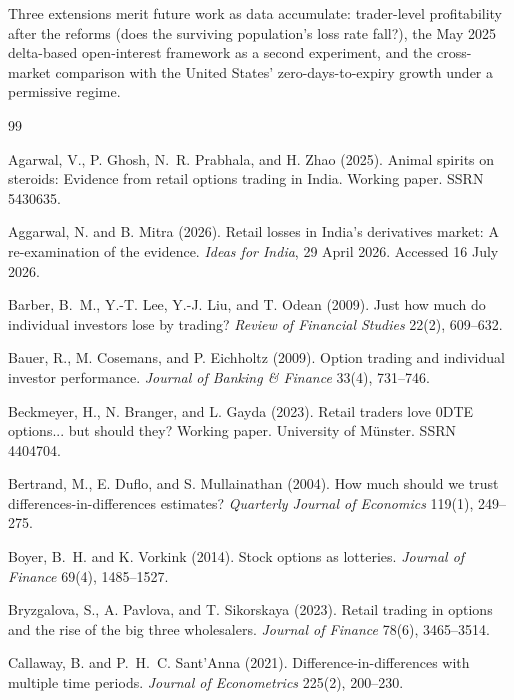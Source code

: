 \documentclass[12pt]{article}
\begin{document}
Three extensions merit future work as data accumulate: trader-level
profitability after the reforms (does the surviving population's loss rate
fall?), the May 2025 delta-based open-interest framework as a second
experiment, and the cross-market comparison with the United States'
zero-days-to-expiry growth under a permissive regime.

\newpage
\begin{thebibliography}{99}

Agarwal, V., P. Ghosh, N.~R. Prabhala, and H. Zhao (2025).
Animal spirits on steroids: Evidence from retail options trading in India.
Working paper. SSRN 5430635.

Aggarwal, N. and B. Mitra (2026).
Retail losses in India's derivatives market: A re-examination of the
evidence.
\emph{Ideas for India}, 29 April 2026. Accessed 16 July 2026.

Barber, B.~M., Y.-T. Lee, Y.-J. Liu, and T. Odean (2009).
Just how much do individual investors lose by trading?
\emph{Review of Financial Studies} 22(2), 609--632.

Bauer, R., M. Cosemans, and P. Eichholtz (2009).
Option trading and individual investor performance.
\emph{Journal of Banking \& Finance} 33(4), 731--746.

Beckmeyer, H., N. Branger, and L. Gayda (2023).
Retail traders love 0DTE options... but should they?
Working paper. University of M\"unster. SSRN 4404704.

Bertrand, M., E. Duflo, and S. Mullainathan (2004).
How much should we trust differences-in-differences estimates?
\emph{Quarterly Journal of Economics} 119(1), 249--275.

Boyer, B.~H. and K. Vorkink (2014).
Stock options as lotteries.
\emph{Journal of Finance} 69(4), 1485--1527.

Bryzgalova, S., A. Pavlova, and T. Sikorskaya (2023).
Retail trading in options and the rise of the big three wholesalers.
\emph{Journal of Finance} 78(6), 3465--3514.

Callaway, B. and P.~H.~C. Sant'Anna (2021).
Difference-in-differences with multiple time periods.
\emph{Journal of Econometrics} 225(2), 200--230.


\end{thebibliography}
\end{document}
